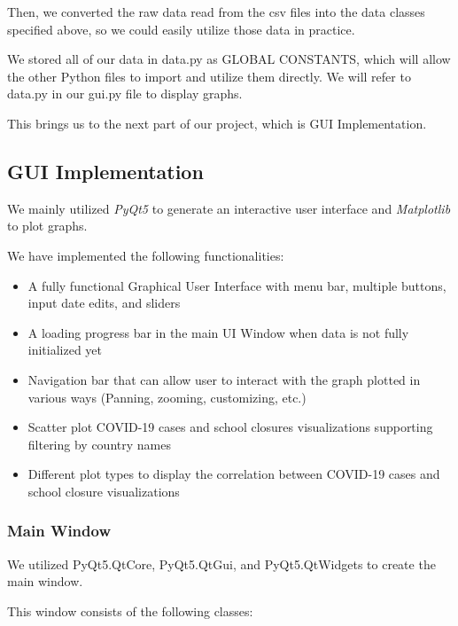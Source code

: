 \documentclass[fontsize=11pt]{article}
\begin{document}
    Then, we converted the raw data read from the csv files into the data classes specified above, so we could easily utilize those data in practice.

    We stored all of our data in data.py as GLOBAL CONSTANTS, which will allow the other Python files to import and utilize them directly. We will refer to data.py in our gui.py file to display graphs.

    This brings us to the next part of our project, which is GUI Implementation.

    \subsection{GUI Implementation}

    We mainly utilized \emph{PyQt5} to generate an interactive user interface and \emph{Matplotlib} to plot graphs.

    We have implemented the following functionalities:

    \begin{itemize}
        \item A fully functional Graphical User Interface with menu bar, multiple buttons, input date edits, and sliders
        \item A loading progress bar in the main UI Window when data is not fully initialized yet
        \item Navigation bar that can allow user to interact with the graph plotted in various ways (Panning, zooming, customizing, etc.)
        \item Scatter plot COVID-19 cases and school closures visualizations supporting filtering by country names
        \item Different plot types to display the correlation between COVID-19 cases and school closure visualizations
    \end{itemize}

    \subsubsection{Main Window}

    We utilized PyQt5.QtCore, PyQt5.QtGui, and PyQt5.QtWidgets to create the main window.

    This window consists of the following classes:
\end{document}
